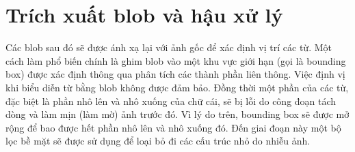 \documentclass[12pt, a4paper]{article}
\begin{document}
\section{Trích xuất blob và hậu xử lý} %
\label{sec:2.6}
Các blob sau đó sẽ được ánh xạ lại với ảnh gốc để xác định vị trí các từ. Một cách làm phổ biến chính là ghim blob vào một khu vực giới hạn (gọi là bounding box) được xác định thông qua phân tích các thành phần liên thông. Việc định vị khi biểu diễn từ bằng blob không được đảm bảo. Đồng thời một phần của các từ, đặc biệt là phần nhô lên và nhô xuống của chữ cái, sẽ bị lỗi do công đoạn tách dòng và làm mịn (làm mờ) ảnh trước đó. Vì lý do trên, bounding box sẽ được mở rộng để bao được hết phần nhô lên và nhô xuống đó. Đến giai đoạn này một bộ lọc bề mặt sẽ được sử dụng để loại bỏ đi các cấu trúc nhỏ do nhiễu ảnh.
\end{document}
